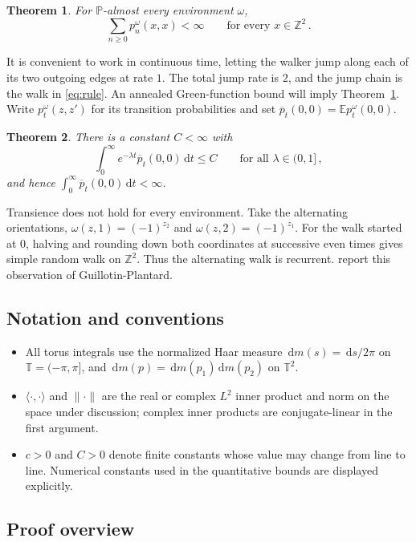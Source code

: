 \documentclass[11pt]{amsart}
\theoremstyle{plain}
\newtheorem{theorem}{Theorem}[section]
\theoremstyle{definition}
\newcommand{\Z}{\mathbb Z}
\newcommand{\T}{\mathbb T}
\newcommand{\E}{\mathbb E}
\renewcommand{\P}{\mathbb P}
\newcommand{\1}{\mathbf 1}
\newcommand{\ip}[2]{\langle #1,#2\rangle}
\newcommand{\norm}[1]{\lVert #1\rVert}
\newcommand{\dd}{\,\mathrm d}
\begin{document}
\begin{theorem}\label{thm:main}
For $\P$-almost every environment $\omega$,
\[
  \sum_{n\geq0}p^\omega_n(x,x)<\infty\qquad\text{for every }x\in\Z^2\, .
\]
\end{theorem}

It is convenient to work in continuous time, letting the walker jump along
each of its two outgoing edges at rate $1$.  The total jump rate is $2$,
and the jump chain is the walk in \eqref{eq:rule}.  An annealed Green-function
bound will imply Theorem~\ref{thm:main}.  Write
$p^\omega_t(z,z')$ for its transition probabilities and set
$\overline p_t(0,0)=\E p^\omega_t(0,0)$.

\begin{theorem}\label{thm:annealed}
There is a constant $C<\infty$ with
\[
  \int_0^\infty e^{-\lambda t}\overline p_t(0,0)\dd t\leq C
  \qquad\text{for all }\lambda\in(0,1]\, ,
\]
and hence $\int_0^\infty\overline p_t(0,0)\dd t<\infty$.
\end{theorem}

Transience does not hold for every environment.  Take the alternating
orientations,
$\omega(z,1)=(-1)^{z_2}$ and $\omega(z,2)=(-1)^{z_1}$.  For the walk started at $0$, halving and rounding down both coordinates
at successive even times gives simple random walk on $\Z^2$.
Thus the alternating walk is recurrent.
\citet*[p.~2]{BH23} report this observation of Guillotin-Plantard.

\subsection{Notation and conventions}\label{ssec:notation}

\begin{itemize}
\item All torus integrals use the normalized Haar measure
$\dd m(s)=\dd s/2\pi$ on $\T=(-\pi,\pi]$, and $\dd m(p)=\dd m(p_1)\dd m(p_2)$
on $\T^2$.
\item $\ip\cdot\cdot$ and $\norm\cdot$ are the real or complex $L^2$ inner
product and norm on the space under discussion; complex inner products
are conjugate-linear in the first argument.
\item $c>0$ and $C>0$ denote finite constants whose value may change from
line to line.  Numerical constants used in the quantitative bounds are
displayed explicitly.
\end{itemize}

\subsection{Proof overview}\label{ssec:proof-overview}
\end{document}
